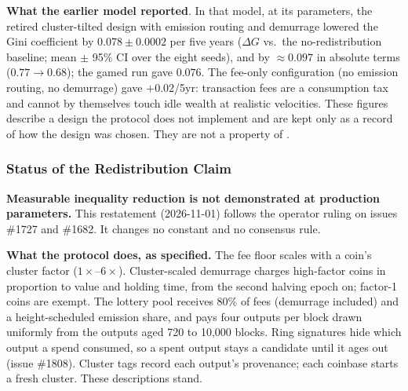 \textbf{What the earlier model reported}. In that model, at its
parameters, the retired cluster-tilted design with emission routing and
demurrage lowered the Gini coefficient by $0.078 \pm 0.0002$ per five years
($\Delta G$ vs.\ the no-redistribution baseline; mean $\pm$ 95\% CI over the
eight seeds), and by $\approx 0.097$ in absolute terms ($0.77 \to 0.68$); the
gamed run gave $0.076$. The fee-only configuration (no emission routing, no
demurrage) gave $+0.02$/5yr: transaction fees are a consumption tax and
cannot by themselves touch idle wealth at realistic velocities. These
figures describe a design the protocol does not implement and are kept only
as a record of how the design was chosen. They are not a property of
\Botho.

\subsubsection{Status of the Redistribution Claim}
\label{sec:redistribution-status}

\textbf{Measurable inequality reduction is not demonstrated at production
parameters.} This restatement (2026-11-01) follows the operator ruling on
issues \#1727 and \#1682. It changes no constant and no consensus rule.

\textbf{What the protocol does, as specified.} The fee floor scales with a
coin's cluster factor ($1\times$--$6\times$). Cluster-scaled demurrage charges
high-factor coins in proportion to value and holding time, from the second
halving epoch on; factor-1 coins are exempt. The lottery pool receives 80\%
of fees (demurrage included) and a height-scheduled emission share, and pays four
outputs per block drawn uniformly from the outputs aged 720 to
10{,}000 blocks. Ring signatures hide which output a spend consumed, so a
spent output stays a candidate until it ages out (issue \#1808). Cluster tags record each output's provenance; each coinbase
starts a fresh cluster. These descriptions stand.

